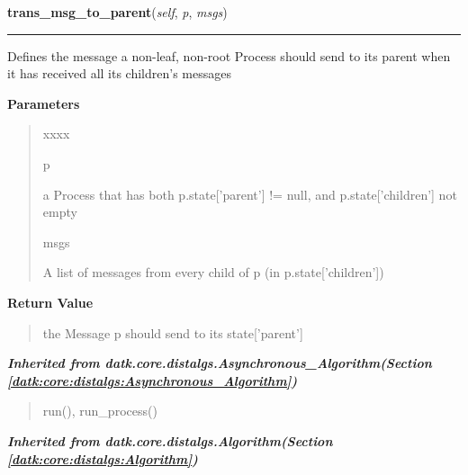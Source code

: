 \hspace{.8\funcindent}\begin{boxedminipage}{\funcwidth}

    \raggedright \textbf{trans\_msg\_to\_parent}(\textit{self}, \textit{p}, \textit{msgs})

    \vspace{-1.5ex}

    \rule{\textwidth}{0.5\fboxrule}
\setlength{\parskip}{2ex}
    Defines the message a non-leaf, non-root Process should send to its 
    parent when it has received all its children's messages

\setlength{\parskip}{1ex}
      \textbf{Parameters}
      \vspace{-1ex}

      \begin{quote}
        \begin{Ventry}{xxxx}

          \item[p]

          a Process that has both p.state['parent'] != null, and 
          p.state['children'] not empty

          \item[msgs]

          A list of messages from every child of p (in p.state['children'])

        \end{Ventry}

      \end{quote}

      \textbf{Return Value}
    \vspace{-1ex}

      \begin{quote}
      the Message p should send to its state['parent']

      \end{quote}

    \end{boxedminipage}


\large{\textbf{\textit{Inherited from datk.core.distalgs.Asynchronous\_Algorithm\textit{(Section \ref{datk:core:distalgs:Asynchronous_Algorithm})}}}}

\begin{quote}
run(), run\_process()
\end{quote}

\large{\textbf{\textit{Inherited from datk.core.distalgs.Algorithm\textit{(Section \ref{datk:core:distalgs:Algorithm})}}}}

